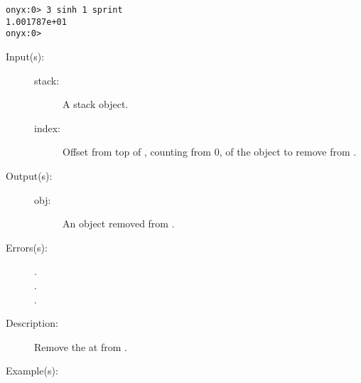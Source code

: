 \begin{description}
\begin{description}
\begin{verbatim}
onyx:0> 3 sinh 1 sprint
1.001787e+01
onyx:0>
		\end{verbatim}
	\end{description}
\label{systemdict:sipop}
\item[{\onyxop{stack index}{sipop}{obj}}: ]
	\begin{description}\item[]
	\item[Input(s): ]
		\begin{description}\item[]
		\item[stack: ]
			A stack object.
		\item[index: ]
			Offset from top of , counting from 0, of
			the object to remove from .
		\end{description}
	\item[Output(s): ]
		\begin{description}\item[]
		\item[obj: ]
			An object removed from .
		\end{description}
	\item[Errors(s): ]
		\begin{description}\item[]
		\item[.]
		\item[.]
		\item[.]
		\end{description}
	\item[Description: ]
		Remove the  at  from .
	\item[Example(s): ]\begin{verbatim}


\end{verbatim}
\end{description}
\end{description}
